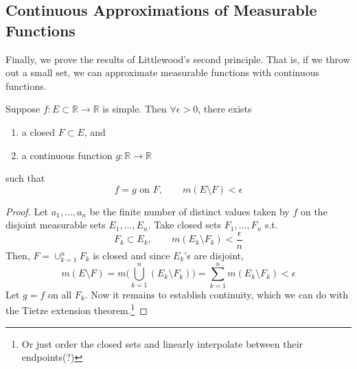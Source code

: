 \subsection{Continuous Approximations of Measurable Functions}

  Finally, we prove the results of Littlewood's second principle. That is, if we throw out a small set, we can approximate measurable functions with continuous functions. 

  \begin{lemma}
    Suppose $f: E \subset \mathbb{R} \to \mathbb{R}$ is simple. Then $\forall \epsilon > 0$, there exists 
    \begin{enumerate}
      \item a closed $F \subset E$, and 
      \item a continuous function $g: \mathbb{R} \to \mathbb{R}$
    \end{enumerate}
    such that
    \begin{equation}
      f = g \text{ on } F, \qquad m(E \setminus F) < \epsilon
    \end{equation}
  \end{lemma}
  \begin{proof}
    Let $a_1, \ldots, a_n$ be the finite number of distinct values taken by $f$ on the disjoint measurable sets $E_1, \ldots, E_n$. Take closed sets $F_1, \ldots, F_n$ s.t. 
    \begin{equation}
      F_k \subset E_k, \qquad m(E_k \setminus F_k) < \frac{\epsilon}{n}
    \end{equation}
    Then, $F = \cup_{k=1}^n F_k$ is closed and since $E_k$'s are disjoint, 
    \begin{equation}
      m(E \setminus F) = m \bigg( \bigcup_{k=1}^n (E_k \setminus F_k) \bigg) = \sum_{k=1}^n m(E_k \setminus F_k) < \epsilon
    \end{equation}
    Let $g = f$ on all $F_k$. Now it remains to establish continuity, which we can do with the Tietze extension theorem.\footnote{Or just order the closed sets and linearly interpolate between their endpoints(?)}
  \end{proof}

